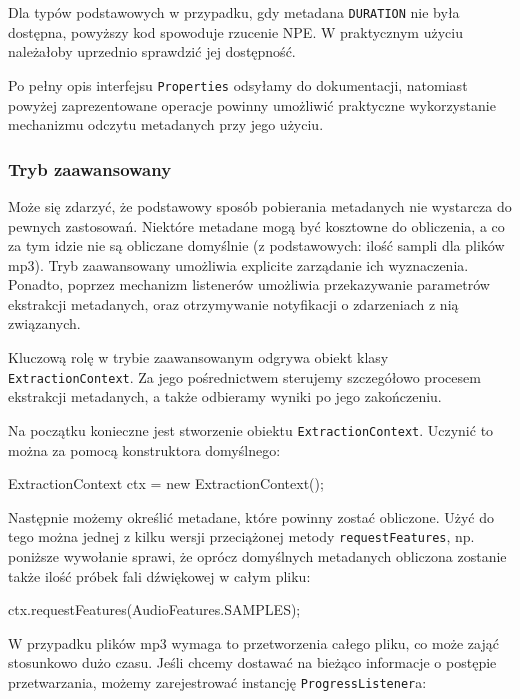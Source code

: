 \begin{Warning}
Dla typów podstawowych w przypadku, gdy metadana \texttt{DURATION} nie była dostępna, powyższy kod
spowoduje rzucenie NPE. W praktycznym użyciu należałoby uprzednio sprawdzić jej dostępność.
\end{Warning}

Po pełny opis interfejsu \texttt{Properties} odsyłamy do dokumentacji, natomiast powyżej
zaprezentowane operacje powinny umożliwić praktyczne wykorzystanie mechanizmu odczytu metadanych
przy jego użyciu.

\subsubsection{Tryb zaawansowany}

Może się zdarzyć, że podstawowy sposób pobierania metadanych nie wystarcza do pewnych zastosowań.
Niektóre metadane mogą być kosztowne do obliczenia, a co za tym idzie nie są obliczane domyślnie (z
podstawowych: ilość sampli dla plików mp3). Tryb zaawansowany umożliwia explicite zarządanie ich
wyznaczenia. Ponadto, poprzez mechanizm listenerów umożliwia przekazywanie parametrów ekstrakcji
metadanych, oraz otrzymywanie notyfikacji o zdarzeniach z nią związanych.

Kluczową rolę w trybie zaawansowanym odgrywa obiekt klasy \texttt{ExtractionContext}. Za jego
pośrednictwem sterujemy szczegółowo procesem ekstrakcji metadanych, a także odbieramy wyniki po jego
zakończeniu.

Na początku konieczne jest stworzenie obiektu \texttt{ExtractionContext}. Uczynić to można za pomocą
konstruktora domyślnego:

\begin{java}
ExtractionContext ctx = new ExtractionContext();
\end{java}

Następnie możemy określić metadane, które powinny zostać obliczone. Użyć do tego można jednej z
kilku wersji przeciążonej metody \texttt{requestFeatures}, np. poniższe wywołanie sprawi, że oprócz
domyślnych metadanych obliczona zostanie także ilość próbek fali dźwiękowej w całym pliku:

\begin{java}
ctx.requestFeatures(AudioFeatures.SAMPLES);
\end{java}

W przypadku plików mp3 wymaga to przetworzenia całego pliku, co może zająć stosunkowo dużo czasu.
Jeśli chcemy dostawać na bieżąco informacje o postępie przetwarzania, możemy zarejestrować instancję
\texttt{ProgressListener}a:

